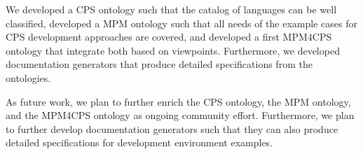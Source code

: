 \documentclass[final]{include/MPM4CPS/MPM4CPS-Report} %
\newcommand{\DONE}[2][N.N.]{{\todo[color=lightgray]{\tiny DONE[#1]: #2}}}
\newcommand{\BLOCK}[1]{ #1 }
\begin{document}

We
%
developed a CPS ontology such that the catalog of languages can be well classified,
developed a MPM ontology such that all needs of the example cases for CPS development approaches are covered, and
developed a first MPM4CPS ontology that integrate both based on viewpoints. 
%
Furthermore, we developed documentation generators that produce detailed specifications from the ontologies.


As future work, we plan 
%
to further enrich the CPS ontology, the MPM ontology, and the MPM4CPS ontology as ongoing community effort. 
%
Furthermore, we plan to further develop documentation generators such that they can also produce detailed specifications for development environment examples.





%


\backmatter


\label{ch:bib} %
 


\BLOCK{
~\newpage
%
\listoftodos
}


\printindex[defined] %
\printindex[introduced] %
\printindex[used] %
\end{document}
